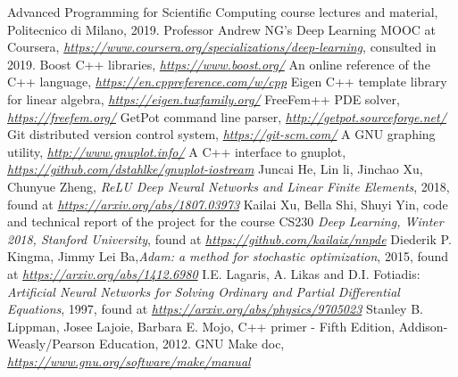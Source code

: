 \documentclass[12pt, a4paper]{report}
\theoremstyle{definition}
\begin{document}
{\begin{thebibliography}{10}
	 Advanced Programming for Scientific Computing course lectures and material, Politecnico di Milano, 2019.
	 Professor Andrew NG's Deep Learning MOOC at Coursera, \href{https://www.coursera.org/specializations/deep-learning}{\emph{https://www.coursera.org/specializations/deep-learning}}, consulted in 2019.
	 Boost C++ libraries, \href{https://www.boost.org/}{\emph{https://www.boost.org/}}
	 An online reference of the C++ language, \href{https://en.cppreference.com/w/cpp}{\emph{https://en.cppreference.com/w/cpp}}
	 Eigen C++ template library for linear algebra, \href{https://eigen.tuxfamily.org/}{\emph{https://eigen.tuxfamily.org/}}
	 FreeFem++ PDE solver, \href{https://freefem.org/}{\emph{https://freefem.org/}}
	 GetPot command line parser, \href{http://getpot.sourceforge.net/}{\emph{http://getpot.sourceforge.net/}}
	 Git distributed version control system, \href{https://git-scm.com/}{\emph{https://git-scm.com/}}
	 A GNU graphing utility, \href{http://www.gnuplot.info/}{\emph{http://www.gnuplot.info/}}
	 A C++ interface to gnuplot, \href{https://github.com/dstahlke/gnuplot-iostream}{\emph{https://github.com/dstahlke/gnuplot-iostream}}
	 Juncai He, Lin li, Jinchao Xu, Chunyue Zheng, \emph{ReLU Deep Neural Networks and Linear Finite Elements}, 2018, found at \href{https://arxiv.org/abs/1807.03973}{\emph{https://arxiv.org/abs/1807.03973}}
	 Kailai Xu, Bella Shi, Shuyi Yin, code and technical report of the project for the course CS230 \emph{Deep Learning, Winter 2018, Stanford University}, found at \href{https://github.com/kailaix/nnpde}{\emph{https://github.com/kailaix/nnpde}}
	 Diederik P. Kingma, Jimmy Lei Ba,\emph{Adam: a method for stochastic optimization}, 2015, found at
	\href{https://arxiv.org/abs/1412.6980}{\emph{https://arxiv.org/abs/1412.6980}} 
	 I.E. Lagaris, A. Likas and D.I. Fotiadis: \emph{Artificial Neural Networks for Solving Ordinary and Partial Differential Equations}, 1997, found at \href{https://arxiv.org/abs/physics/9705023}{\emph{https://arxiv.org/abs/physics/9705023}}
	 Stanley B. Lippman, Josee Lajoie, Barbara E. Mojo, C++ primer - Fifth Edition, Addison-Weasly/Pearson Education, 2012.
	 GNU Make doc,  \href{https://www.gnu.org/software/make/manual}{\emph{https://www.gnu.org/software/make/manual}}

\end{thebibliography}}
\end{document}
